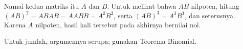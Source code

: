 \begin{exercises}
\begin{answer}
      Namai kedua matriks itu \( A \) dan \( B \).
      Untuk melihat bahwa \( AB \) nilpoten, hitung
      $
         (AB)^2=ABAB=AABB=A^2B^2$,
      serta
         $(AB)^3=A^3B^3$, dan seterusnya.
      Karena \( A \) nilpoten, hasil kali tersebut pada akhirnya bernilai nol.

      Untuk jumlah, argumennya serupa; gunakan Teorema Binomial.
     \end{answer}


\end{exercises}

